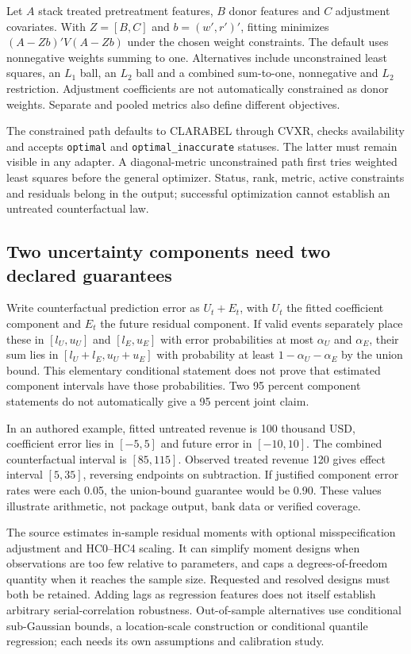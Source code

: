 Let $A$ stack treated pretreatment features, $B$ donor features and $C$
adjustment covariates. With $Z=[B,C]$ and $b=(w',r')'$, fitting minimizes
$(A-Zb)'V(A-Zb)$ under the chosen weight constraints. The default uses
nonnegative weights summing to one. Alternatives include unconstrained
least squares, an $L_1$ ball, an $L_2$ ball and a combined sum-to-one,
nonnegative and $L_2$ restriction. Adjustment coefficients are not
automatically constrained as donor weights. Separate and pooled metrics
also define different objectives.~\citep{exec24_scpi_source}

The constrained path defaults to CLARABEL through CVXR, checks availability
and accepts \texttt{optimal} and \texttt{optimal\_inaccurate} statuses. The
latter must remain visible in any adapter. A diagonal-metric unconstrained
path first tries weighted least squares before the general optimizer.
Status, rank, metric, active constraints and residuals belong in the output;
successful optimization cannot establish an untreated counterfactual law.
\citep{exec24_scpi_source,exec24_scpi_choice}

\subsection{Two uncertainty components need two declared guarantees}
Write counterfactual prediction error as $U_t+E_t$, with $U_t$ the fitted
coefficient component and $E_t$ the future residual component. If valid
events separately place these in $[l_U,u_U]$ and $[l_E,u_E]$ with error
probabilities at most $\alpha_U$ and $\alpha_E$, their sum lies in
$[l_U+l_E,u_U+u_E]$ with probability at least $1-\alpha_U-\alpha_E$ by
the union bound. This elementary conditional statement does not prove that
estimated component intervals have those probabilities. Two 95 percent
component statements do not automatically give a 95 percent joint claim.
\citep{exec24_scpi_choice}

In an authored example, fitted untreated revenue is 100 thousand USD,
coefficient error lies in $[-5,5]$ and future error in $[-10,10]$. The
combined counterfactual interval is $[85,115]$. Observed treated revenue
120 gives effect interval $[5,35]$, reversing endpoints on subtraction.
If justified component error rates were each 0.05, the union-bound
guarantee would be 0.90. These values illustrate arithmetic, not package
output, bank data or verified coverage.~\citep{exec24_scpi_choice}

The source estimates in-sample residual moments with optional
misspecification adjustment and HC0--HC4 scaling. It can simplify moment
designs when observations are too few relative to parameters, and caps a
degrees-of-freedom quantity when it reaches the sample size. Requested and
resolved designs must both be retained. Adding lags as regression features
does not itself establish arbitrary serial-correlation robustness.
Out-of-sample alternatives use conditional sub-Gaussian bounds, a
location-scale construction or conditional quantile regression; each needs
its own assumptions and calibration study.~\citep{exec24_scpi_source}

